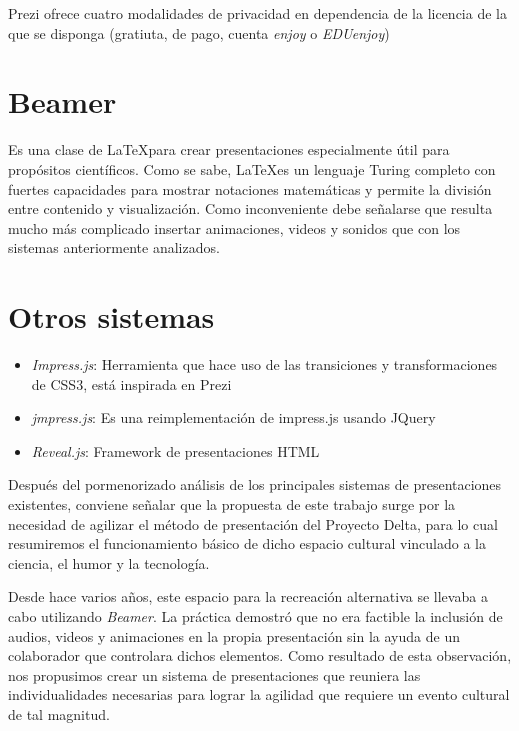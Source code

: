 		Prezi ofrece cuatro modalidades de privacidad en dependencia de la licencia de la que se disponga (gratiuta, de pago, cuenta \textit{enjoy} o \textit{EDUenjoy})		

	\section*{Beamer} %
	\label{sec:beamer}

		Es una clase de \LaTeX para crear presentaciones especialmente útil para propósitos científicos. Como se sabe, \LaTeX es un lenguaje Turing completo con fuertes capacidades para mostrar notaciones matemáticas y permite la división entre contenido y visualización. Como inconveniente debe señalarse que resulta mucho más complicado insertar animaciones, videos y sonidos que con los sistemas anteriormente analizados.	


	\section*{Otros sistemas} %
	\label{sec:otros_sistemas}
		\begin{itemize}
			\item \textit{Impress.js}: Herramienta que hace uso de las transiciones y transformaciones de CSS3, está inspirada en Prezi
			\item \textit{jmpress.js}: Es una reimplementación de impress.js usando JQuery
			\item \textit{Reveal.js}: Framework de presentaciones HTML
		\end{itemize}

	Después del pormenorizado análisis de los principales sistemas de presentaciones existentes, conviene señalar que la propuesta de este trabajo surge por la necesidad de agilizar el método de presentación del Proyecto Delta, para lo cual resumiremos el funcionamiento básico de dicho espacio cultural vinculado a la ciencia, el humor y la tecnología.

	Desde hace varios años, este espacio para la recreación alternativa se llevaba a cabo utilizando \textit{Beamer}. La práctica demostró que no era factible la inclusión de audios, videos y animaciones en la propia presentación sin la ayuda de un colaborador que controlara dichos elementos. Como resultado de esta observación, nos propusimos crear un sistema de presentaciones que reuniera las individualidades necesarias para lograr la agilidad que requiere un evento cultural de tal magnitud.

